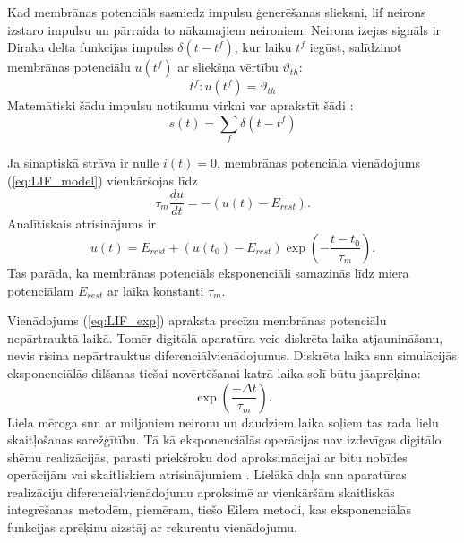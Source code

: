 Kad membrānas potenciāls sasniedz impulsu ģenerēšanas slieksni, \Gls{lif} neirons izstaro impulsu un pārraida to nākamajiem neironiem. Neirona izejas signāls ir Diraka delta funkcijas impulss \(\delta(t - t^f)\), kur laiku \(t^f\) iegūst, salīdzinot membrānas potenciālu \(u(t^f)\) ar sliekšņa vērtību \(\vartheta_{th}\):
\begin{equation}
    t^f: u(t^f) = \vartheta_{th}
\end{equation}
Matemātiski šādu impulsu notikumu virkni var aprakstīt šādi \cite{kim2020}:
\begin{equation}
    s(t) = \sum_f \delta(t - t^f)
\end{equation}


Ja sinaptiskā strāva ir nulle \(i(t) = 0\), membrānas potenciāla vienādojums (\ref{eq:LIF_model}) vienkāršojas līdz
\begin{equation}
    \tau_m \frac{du}{dt} = - (u(t) - E_{rest}).
\end{equation}
Analītiskais atrisinājums ir
\begin{equation}
    u(t) = E_{rest} + (u(t_0) - E_{rest}) \exp \left ( - \frac{t - t_0}{\tau_m} \right ).
    \label{eq:LIF_exp}
\end{equation}
Tas parāda, ka membrānas potenciāls eksponenciāli samazinās līdz miera potenciālam \(E_{rest}\) ar laika konstanti \(\tau_m\).

Vienādojums (\ref{eq:LIF_exp}) apraksta precīzu membrānas potenciālu nepārtrauktā laikā. Tomēr digitālā aparatūra veic diskrēta laika atjaunināšanu, nevis risina nepārtrauktus diferenciālvienādojumus. Diskrēta laika \Gls{snn} simulācijās eksponenciālās dilšanas tiešai novērtēšanai katrā laika solī būtu jāaprēķina:
\begin{equation}
    \exp \left ( \frac{-\Delta t}{\tau_m} \right ).
\end{equation}
Liela mēroga \Gls{snn} ar miljoniem neironu un daudziem laika soļiem tas rada lielu skaitļošanas sarežģītību. Tā kā eksponenciālās operācijas nav izdevīgas digitālo shēmu realizācijās, parasti priekšroku dod aproksimācijai ar bitu nobīdes operācijām vai skaitliskiem atrisinājumiem \cite{corradi2021}. Lielākā daļa \Gls{snn} aparatūras realizāciju diferenciālvienādojumu aproksimē ar vienkāršām skaitliskās integrēšanas metodēm, piemēram, tiešo Eilera metodi, kas eksponenciālās funkcijas aprēķinu aizstāj ar rekurentu vienādojumu.

